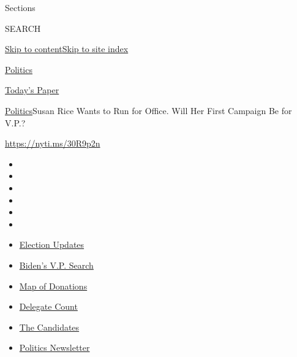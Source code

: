 Sections

SEARCH

\protect\hyperlink{site-content}{Skip to
content}\protect\hyperlink{site-index}{Skip to site index}

\href{https://www.nytimes.com/section/politics}{Politics}

\href{https://myaccount.nytimes.com/auth/login?response_type=cookie\&client_id=vi}{}

\href{https://www.nytimes.com/section/todayspaper}{Today's Paper}

\href{/section/politics}{Politics}\textbar{}Susan Rice Wants to Run for
Office. Will Her First Campaign Be for V.P.?

\url{https://nyti.ms/30R9p2n}

\begin{itemize}
\item
\item
\item
\item
\item
\item
\end{itemize}

\begin{itemize}
\item
  \href{https://www.nytimes.com/2020/07/31/us/elections/biden-vs-trump.html?action=click\&pgtype=Article\&state=default\&region=TOP_BANNER\&context=storylines_menu}{Election
  Updates}
\item
  \href{https://www.nytimes.com/article/biden-vice-president-2020.html?action=click\&pgtype=Article\&state=default\&region=TOP_BANNER\&context=storylines_menu}{Biden's
  V.P. Search}
\item
  \href{https://www.nytimes.com/interactive/2020/07/24/us/politics/trump-biden-campaign-donors.html?action=click\&pgtype=Article\&state=default\&region=TOP_BANNER\&context=storylines_menu}{Map
  of Donations}
\item
  \href{https://www.nytimes.com/interactive/2020/us/elections/delegate-count-primary-results.html?action=click\&pgtype=Article\&state=default\&region=TOP_BANNER\&context=storylines_menu}{Delegate
  Count}
\item
  \href{https://www.nytimes.com/interactive/2019/us/politics/2020-presidential-candidates.html?action=click\&pgtype=Article\&state=default\&region=TOP_BANNER\&context=storylines_menu}{The
  Candidates}
\item
  \href{https://www.nytimes.com/newsletters/politics?action=click\&pgtype=Article\&state=default\&region=TOP_BANNER\&context=storylines_menu}{Politics
  Newsletter}
\end{itemize}

